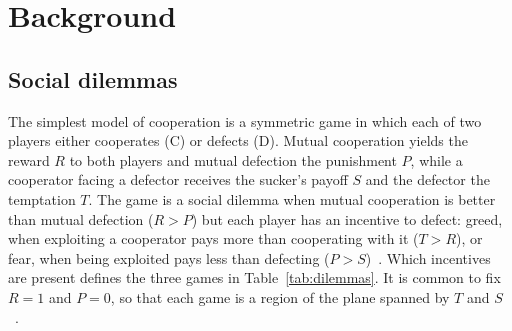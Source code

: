 %
%

\section{Background}
\label{sec:background}

\subsection{Social dilemmas}

The simplest model of cooperation is a symmetric game in which each of two players either cooperates (C) or defects (D). Mutual cooperation yields the reward $R$ to both players and mutual defection the punishment $P$, while a cooperator facing a defector receives the sucker's payoff $S$ and the defector the temptation $T$. The game is a social dilemma when mutual cooperation is better than mutual defection ($R>P$) but each player has an incentive to defect: greed, when exploiting a cooperator pays more than cooperating with it ($T>R$), or fear, when being exploited pays less than defecting ($P>S$)~\cite{Macy2002}. Which incentives are present defines the three games in Table~\ref{tab:dilemmas}. It is common to fix $R=1$ and $P=0$, so that each game is a region of the plane spanned by $T$ and $S$~\cite{Santos2006b}.

